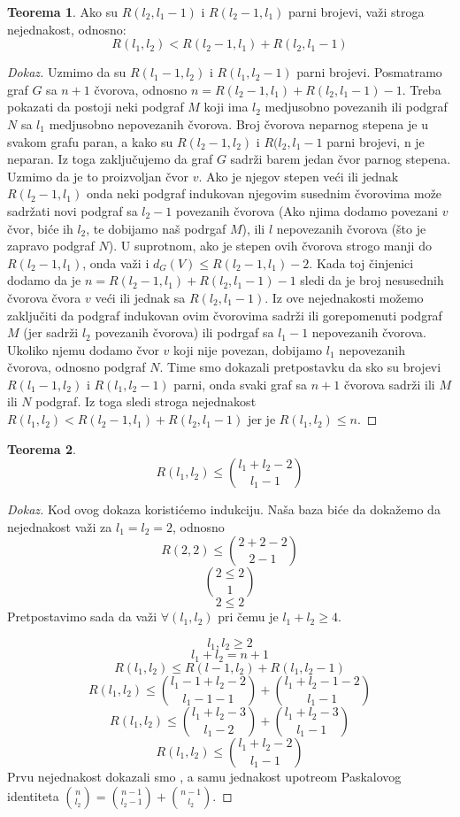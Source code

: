 \documentclass{article}
\theoremstyle{definition}
\newtheorem{teorema}{Teorema}[section]
\newcommand{\dokaz}[1]{\begin{proof}[Dokaz]#1\end{proof}}
\begin{document}
	\begin{teorema}
		Ako su $R(l_2, l_1-1)$ i $R(l_2-1, l_1)$ parni brojevi, važi stroga nejednakost, odnosno: 
		\[
		R(l_1,l_2) < R(l_2-1, l_1) + R(l_2, l_1-1)
		\]
	\end{teorema}
	\dokaz{
		Uzmimo da su $R(l_1-1, l_2)$ i $R(l_1, l_2-1)$ parni brojevi. Posmatramo graf $G$ sa $n+1$ čvorova, odnosno $n=R(l_2-1, l_1)+ R(l_2, l_1-1)-1$.
		Treba pokazati da postoji neki podgraf $M$ koji ima $l_2$ medjusobno povezanih ili podgraf $N$ sa $l_1$ medjusobno nepovezanih čvorova. Broj čvorova neparnog stepena je u svakom grafu paran, a kako su $R(l_2-1, l_2)$ i $R(l_2, l_1-1$ parni brojevi, n je neparan. Iz toga zaključujemo da graf $G$ sadrži barem jedan čvor parnog stepena. Uzmimo da je to proizvoljan čvor $v$. Ako je njegov stepen veći ili jednak $R(l_2-1,l_1)$ onda neki podgraf indukovan njegovim susednim čvorovima može sadržati novi podgraf sa $l_2-1$ povezanih čvorova (Ako njima dodamo povezani $v$ čvor, biće ih $l_2$, te dobijamo naš podrgaf $M$), ili $l$ nepovezanih čvorova (što je zapravo podgraf $N$). 
		\newline
		U suprotnom, ako je stepen ovih čvorova strogo manji do $R(l_2-1,l_1)$, onda važi i $d_G(V) \leq R(l_2-1, l_1)-2$. Kada toj činjenici dodamo da je $n=R(l_2-1, l_1)+ R(l_2, l_1-1)-1$ sledi da je broj nesusednih čvorova čvora $v$ veći ili jednak sa $R(l_2, l_1-1)$. Iz ove nejednakosti možemo zaključiti da podgraf indukovan ovim čvorovima sadrži ili gorepomenuti podgraf $M$ (jer sadrži $l_2$ povezanih čvorova) ili podrgaf sa $l_1-1$ nepovezanih čvorova. Ukoliko njemu dodamo čvor $v$ koji nije povezan, dobijamo $l_1$ nepovezanih čvorova, odnosno podgraf $N$.
		\newline
		Time smo dokazali pretpostavku da sko su brojevi $R(l_1-1, l_2)$ i $R(l_1, l_2-1)$ parni, onda svaki graf sa $n+1$ čvorova sadrži ili $M$ ili $N$ podgraf. Iz toga sledi stroga nejednakost $R(l_1,l_2) < R(l_2-1, l_1) + R(l_2, l_1-1)$ jer je $R(l_1,l_2) \leq n$. 
	}
	
	
	
	
	\begin{teorema}
		\[R(l_1,l_2) \leq {l_1+l_2-2\choose l_1-1} 
		\]
	\end{teorema}
	\dokaz{
		Kod ovog dokaza koristićemo indukciju. Naša baza biće da dokažemo da nejednakost važi za $l_1=l_2=2$, odnosno
		\[ R(2,2) \leq {2+2-2 \choose 2-1}
		\]
		\[
		2 \leq 2 \choose 1
		\]
		\[
		2 \leq 2
		\]
		Pretpostavimo sada da važi $\forall(l_1,l_2)$  pri čemu je $l_1+l_2 \geq 4$.
		
		\[l_1,l_2 \geq 2
		\]
		\[
		l_1+l_2=n+1
		\]
		\[
		R(l_1,l_2) \leq R(l-1, l_2) + R(l_1, l_2-1)
		\]
		\[
		R(l_1,l_2) \leq {{l_1-1+l_2-2 \choose l_1-1-1} + {l_1+l_2-1-2 \choose l_1-1}}
		\]
		\[
		R(l_1,l_2) \leq {{l_1+l_2-3 \choose l_1-2} + {l_1+l_2-3 \choose l_1-1}}
		\]
		\[
		R(l_1,l_2) \leq {l_1+l_2-2 \choose l_1-1}
		\]
		Prvu nejednakost dokazali smo %
		, a samu jednakost upotreom Paskalovog identiteta ${n \choose l_2} = {n-1 \choose l_2-1} + {n-1 \choose l_2}$.
	}
	
\end{document}
